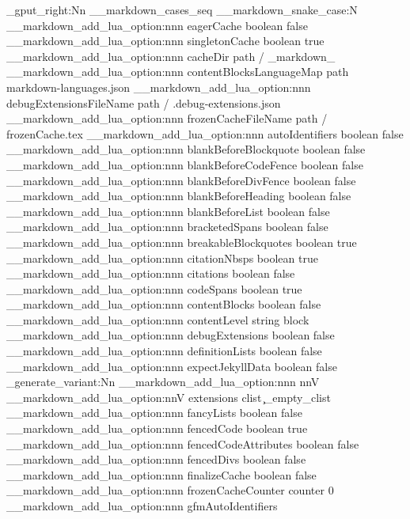 \seq_gput_right:Nn \g__markdown_cases_seq { __markdown_snake_case:N }
\__markdown_add_lua_option:nnn
  { eagerCache }
  { boolean }
  { false }
\__markdown_add_lua_option:nnn
  { singletonCache }
  { boolean }
  { true }
\__markdown_add_lua_option:nnn
  { cacheDir }
  { path }
  { \markdownOptionOutputDir / _markdown_\jobname }
\__markdown_add_lua_option:nnn
  { contentBlocksLanguageMap }
  { path }
  { markdown-languages.json }
\__markdown_add_lua_option:nnn
  { debugExtensionsFileName }
  { path }
  { \markdownOptionOutputDir / \jobname .debug-extensions.json }
\__markdown_add_lua_option:nnn
  { frozenCacheFileName }
  { path }
  { \markdownOptionCacheDir / frozenCache.tex }
\__markdown_add_lua_option:nnn
  { autoIdentifiers }
  { boolean }
  { false }
\__markdown_add_lua_option:nnn
  { blankBeforeBlockquote }
  { boolean }
  { false }
\__markdown_add_lua_option:nnn
  { blankBeforeCodeFence }
  { boolean }
  { false }
\__markdown_add_lua_option:nnn
  { blankBeforeDivFence }
  { boolean }
  { false }
\__markdown_add_lua_option:nnn
  { blankBeforeHeading }
  { boolean }
  { false }
\__markdown_add_lua_option:nnn
  { blankBeforeList }
  { boolean }
  { false }
\__markdown_add_lua_option:nnn
  { bracketedSpans }
  { boolean }
  { false }
\__markdown_add_lua_option:nnn
  { breakableBlockquotes }
  { boolean }
  { true }
\__markdown_add_lua_option:nnn
  { citationNbsps }
  { boolean }
  { true }
\__markdown_add_lua_option:nnn
  { citations }
  { boolean }
  { false }
\__markdown_add_lua_option:nnn
  { codeSpans }
  { boolean }
  { true }
\__markdown_add_lua_option:nnn
  { contentBlocks }
  { boolean }
  { false }
\__markdown_add_lua_option:nnn
  { contentLevel }
  { string }
  { block }
\__markdown_add_lua_option:nnn
  { debugExtensions }
  { boolean }
  { false }
\__markdown_add_lua_option:nnn
  { definitionLists }
  { boolean }
  { false }
\__markdown_add_lua_option:nnn
  { expectJekyllData }
  { boolean }
  { false }
\cs_generate_variant:Nn
  \__markdown_add_lua_option:nnn
  { nnV }
\__markdown_add_lua_option:nnV
  { extensions }
  { clist }
  \c_empty_clist
\__markdown_add_lua_option:nnn
  { fancyLists }
  { boolean }
  { false }
\__markdown_add_lua_option:nnn
  { fencedCode }
  { boolean }
  { true }
\__markdown_add_lua_option:nnn
  { fencedCodeAttributes }
  { boolean }
  { false }
\__markdown_add_lua_option:nnn
  { fencedDivs }
  { boolean }
  { false }
\__markdown_add_lua_option:nnn
  { finalizeCache }
  { boolean }
  { false }
\__markdown_add_lua_option:nnn
  { frozenCacheCounter }
  { counter }
  { 0 }
\__markdown_add_lua_option:nnn
  { gfmAutoIdentifiers }
